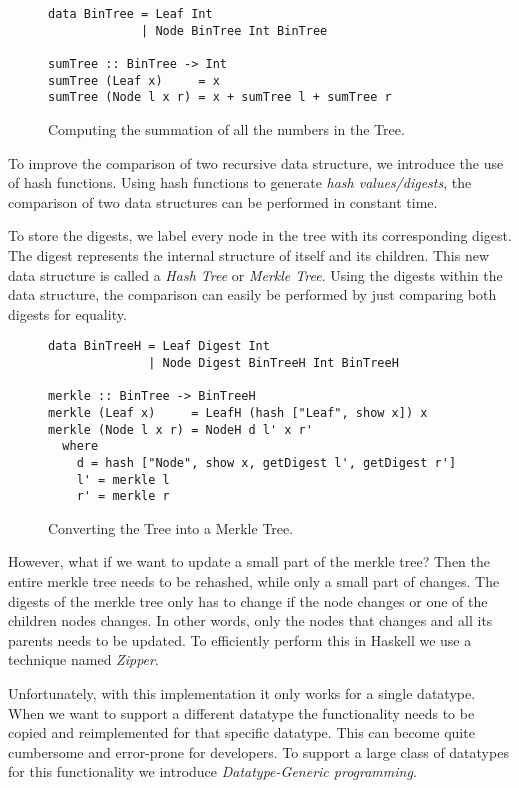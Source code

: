 \begin{figure}[H]
\captionsetup{justification=justified,singlelinecheck=false,margin=0cm}
\begin{verbatim}
data BinTree = Leaf Int
             | Node BinTree Int BinTree

sumTree :: BinTree -> Int
sumTree (Leaf x)     = x
sumTree (Node l x r) = x + sumTree l + sumTree r
\end{verbatim}
\caption{Computing the summation of all the numbers in the Tree.}
\label{fig-bin-tree}
\end{figure}

To improve the comparison of two recursive data structure, we introduce the use of hash functions. Using hash functions to generate \textit{hash values/digests}, the comparison of two data structures can be performed in constant time.

To store the digests, we label every node in the tree with its corresponding digest. The digest represents the internal structure of itself and its children. This new data structure is called a \textit{Hash Tree} or \textit{Merkle Tree}\cite{merkle1987digital}. Using the digests within the data structure, the comparison can easily be performed by just comparing both digests for equality.

\begin{figure}[H]
\captionsetup{justification=justified,singlelinecheck=false,margin=0cm}
\begin{verbatim}
data BinTreeH = Leaf Digest Int
              | Node Digest BinTreeH Int BinTreeH

merkle :: BinTree -> BinTreeH
merkle (Leaf x)     = LeafH (hash ["Leaf", show x]) x
merkle (Node l x r) = NodeH d l' x r'
  where
    d = hash ["Node", show x, getDigest l', getDigest r']
    l' = merkle l
    r' = merkle r
\end{verbatim}
\caption{Converting the Tree into a Merkle Tree.}
\label{fig-conv-tree}
\end{figure}

However, what if we want to update a small part of the merkle tree? Then the entire merkle tree needs to be rehashed, while only a small part of changes. The digests of the merkle tree only has to change if the node changes or one of the children nodes changes. In other words, only the nodes that changes and all its parents needs to be updated. To efficiently perform this in Haskell we use a technique named \textit{Zipper}\cite{huet1997zipper}.  

Unfortunately, with this implementation it only works for a single datatype. When we want to support a different datatype the functionality needs to be copied and reimplemented for that specific datatype. This can become quite cumbersome and error-prone for developers. To support a large class of datatypes for this functionality we introduce \textit{Datatype-Generic programming}.

